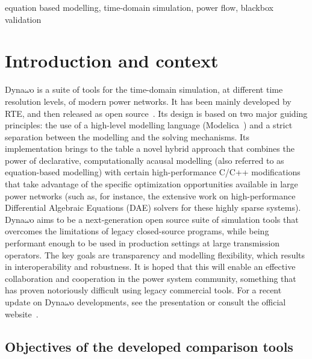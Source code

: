 \documentclass[conference]{IEEEtran}
\begin{document}
\begin{IEEEkeywords}
  equation based modelling, time-domain simulation, power flow, blackbox validation
\end{IEEEkeywords}




\section{Introduction and context}

Dyna$\omega$o \cite{Guironnet18} is a suite of tools for the time-domain simulation, at
different time resolution levels, of modern power networks.  It has been mainly
developed by RTE, and then released as open source~\cite{Dynawo}. Its design is
based on two major guiding principles: the use of a high-level modelling
language (Modelica~\cite{Modelica}) and a strict separation between the
modelling and the solving mechanisms.  Its implementation brings to the table a
novel hybrid approach that combines the power of declarative, computationally
acausal modelling (also referred to as equation-based modelling) with certain
high-performance C/C++ modifications that take advantage of the specific
optimization opportunities available in large power networks (such as, for
instance, the extensive work on high-performance Differential Algebraic Equations (DAE) solvers for these highly
sparse systems).  Dyna$\omega$o aims to be a next-generation open source suite of simulation tools
that overcomes the limitations of legacy closed-source programs, while being
performant enough to be used in production settings at large transmission
operators. The key goals are transparency and modelling flexibility, which
results in interoperability and robustness. It is hoped that this will enable an
effective collaboration and cooperation in the power system community, something
that has proven notoriously difficult using legacy commercial tools.  For a
recent update on Dyna$\omega$o developments, see the presentation \cite{Guironnet21}
or consult the official website~\cite{Dynawo}.



\subsection{Objectives of the developed comparison tools }
\end{document}
